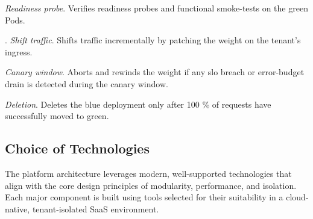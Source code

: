 \documentclass[11pt, a4paper, oneside, listof=totoc]{scrartcl}
\begin{document}
                    \begin{enumerate}[label={[\arabic*]:},
                        ref=Challenge~\arabic*,
                        leftmargin=*,
                        itemsep=0.6\baselineskip]

                        \item\label{chal:readinessProbe}
                            \textit{Readiness probe}.
                            Verifies readiness probes and functional smoke-tests on the green Pods.

                        \item\label{chal:shiftTraffic}.
                            \textit{Shift traffic}.
                            Shifts traffic incrementally by patching the weight on the tenant's
                            ingress.

                        \item\label{chal:canaryWindow}
                            \textit{Canary window}.
                            Aborts and rewinds the weight if any \gls{slo} breach or error-budget
                            drain is detected during the canary window.
                        
                        \item\label{chal:deletion}
                            \textit{Deletion}.
                            Deletes the blue deployment only after 100 \% of requests have
                            successfully moved to green.

                    \end{enumerate}

            \cleardoublepage

        \subsection{Choice of Technologies}\label{subsec:technologies}
            The platform architecture leverages modern, well-supported technologies that align with
            the core design principles of modularity, performance, and isolation.
            Each major component is built using tools selected for their suitability in a
            cloud-native, tenant-isolated SaaS environment.
\end{document}
